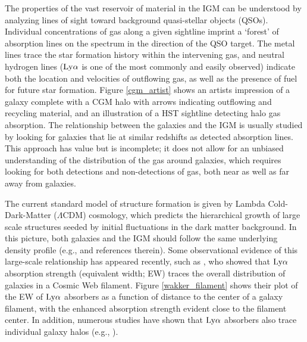 \documentclass[twocolumn,tighten]{aastex62}
\begin{document}
The properties of the vast reservoir of material in the IGM can be understood by analyzing lines of sight toward background quasi-stellar objects (QSOs). Individual concentrations of gas along a given sightline imprint a `forest' of absorption lines on the spectrum in the direction of the QSO target. The metal lines trace the star formation history within the intervening gas, and neutral hydrogen lines ($\rm Ly\alpha$ is one of the most commonly and easily observed) indicate both the location and velocities of outflowing gas, as well as the presence of fuel for future star formation. Figure \ref{cgm_artist} shows an artists impression of a galaxy complete with a CGM halo with arrows indicating outflowing and recycling material, and an illustration of a HST sightline detecting halo gas absorption. The relationship between the galaxies and the IGM is usually studied by looking for galaxies that lie at similar redshifts as detected absorption lines. This approach has value but is incomplete; it does not allow for an unbiased understanding of the distribution of the gas around galaxies, which requires looking for both detections and non-detections of gas, both near as well as far away from galaxies.

The current standard model of structure formation is given by Lambda Cold-Dark-Matter ($\Lambda$CDM) cosmology, which predicts the hierarchical growth of large scale structures seeded by initial fluctuations in the dark matter background. In this picture, both galaxies and the IGM should follow the same underlying density profile (e.g., \citealt{fukugita2006, frieman2008} and references therein). Some observational evidence of this large-scale relationship has appeared recently, such as \cite{wakker2015}, who showed that $\rm Ly\alpha$ absorption strength (equivalent width; EW) traces the overall distribution of galaxies in a Cosmic Web filament. Figure \ref{wakker_filament} shows their plot of the EW of $\rm Ly\alpha$ absorbers as a function of distance to the center of a galaxy filament, with the enhanced absorption strength evident close to the filament center. In addition, numerous studies have shown that $\rm Ly\alpha$ absorbers also trace individual galaxy halos (e.g., \citealt{lanzetta1995, chen1998, chen2001a,  tripp1998, bowen2002, cote2005, wakker2009, steidel2010, prochaska2011, thom2012, stocke2013, tumlinson2013, liang2014, danforth2016}). 
\end{document}
